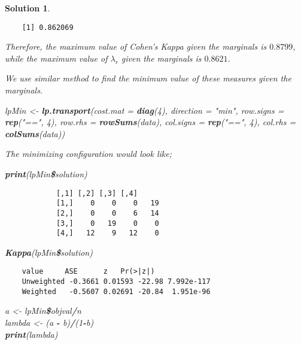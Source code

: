 \documentclass[12pt]{article}
\newenvironment{Shaded}{\begin{snugshade}}{\end{snugshade}}
\newcommand{\KeywordTok}[1]{\textcolor[rgb]{0.13,0.29,0.53}{\textbf{#1}}}
\newcommand{\DataTypeTok}[1]{\textcolor[rgb]{0.13,0.29,0.53}{#1}}
\newcommand{\DecValTok}[1]{\textcolor[rgb]{0.00,0.00,0.81}{#1}}
\newcommand{\StringTok}[1]{\textcolor[rgb]{0.31,0.60,0.02}{#1}}
\newcommand{\OperatorTok}[1]{\textcolor[rgb]{0.81,0.36,0.00}{\textbf{#1}}}
\newcommand{\NormalTok}[1]{#1}
\theoremstyle{problemstyle}
\newtheorem*{solution*}{Solution}
\begin{document}
\begin{solution*}
\begin{enumerate}
	\begin{verbatim}
	[1] 0.862069
	\end{verbatim}
	
	Therefore, the maximum value of Cohen's Kappa given the marginals is
	\(0.8799\), while the maximum value of \(\lambda_r\) given the marginals
	is \(0.8621\).
	
	We use similar method to find the minimum value of these measures given
	the marginals.
	
	\begin{Shaded}
			\NormalTok{lpMin \textless- }\StringTok{ }\KeywordTok{lp.transport}\NormalTok{(}\DataTypeTok{cost.mat =} \KeywordTok{diag}\NormalTok{(}\DecValTok{4}\NormalTok{), }\DataTypeTok{direction =} \StringTok{"min"}\NormalTok{, }
			\DataTypeTok{row.signs =} \KeywordTok{rep}\NormalTok{(}\StringTok{"=="}\NormalTok{, }\DecValTok{4}\NormalTok{), }\DataTypeTok{row.rhs =} \KeywordTok{rowSums}\NormalTok{(data), }
			\DataTypeTok{col.signs =} \KeywordTok{rep}\NormalTok{(}\StringTok{"=="}\NormalTok{, }\DecValTok{4}\NormalTok{), }\DataTypeTok{col.rhs =} \KeywordTok{colSums}\NormalTok{(data))}
	\end{Shaded}
	
	The minimizing configuration would look like;
	
	\begin{Shaded}
			\KeywordTok{print}\NormalTok{(lpMin}\OperatorTok{\$}\NormalTok{solution)}
	\end{Shaded}
			
			\begin{verbatim}
			[,1] [,2] [,3] [,4]
			[1,]    0    0    0   19
			[2,]    0    0    6   14
			[3,]    0   19    0    0
			[4,]   12    9   12    0
			\end{verbatim}
			
		\begin{Shaded}
			\KeywordTok{Kappa}\NormalTok{(lpMin}\OperatorTok{\$}\NormalTok{solution)}
	\end{Shaded}
	
	\begin{verbatim}
	value     ASE      z   Pr(>|z|)
	Unweighted -0.3661 0.01593 -22.98 7.992e-117
	Weighted   -0.5607 0.02691 -20.84  1.951e-96
	\end{verbatim}
	
	\begin{Shaded}
			\NormalTok{a \textless- }\StringTok{ }\NormalTok{lpMin}\OperatorTok{\$}\NormalTok{objval}\OperatorTok{/}\NormalTok{n}\\
			\NormalTok{lambda \textless- }\StringTok{ }\NormalTok{(a }\OperatorTok{-}\StringTok{ }\NormalTok{b)}\OperatorTok{/}\NormalTok{(}\DecValTok{1}\OperatorTok{-}\NormalTok{b)}\\
			\KeywordTok{print}\NormalTok{(lambda)}
	\end{Shaded}
			

\end{enumerate}
\end{solution*}
\end{document}
